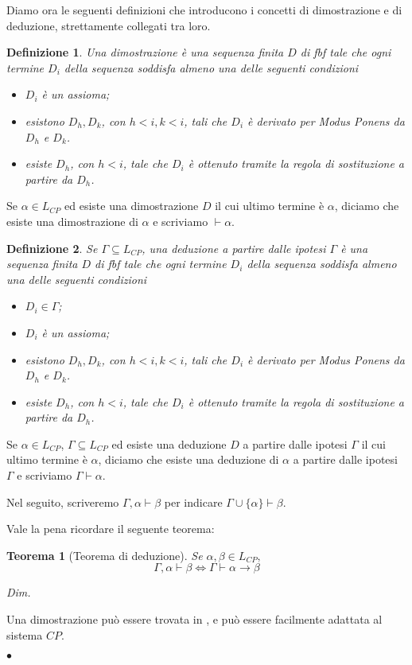 \documentclass[a4paper, titlepage, 12pt]{report}
\newtheorem{theorem}{Teorema}[chapter]
\newtheorem{definition}{Definizione}[chapter]
\newenvironment{proof}
    {\textit{Dim.}
    }
    {\begin{flushright}$\bullet$\end{flushright}
    }
\begin{document}
Diamo ora le seguenti definizioni che introducono i concetti di dimostrazione e di
deduzione, strettamente collegati tra loro.

\begin{definition}
Una dimostrazione è una sequenza finita $D$ di fbf tale che
ogni termine $D_i$ della sequenza soddisfa almeno una delle seguenti condizioni
\begin{itemize}
\item $D_i$ è un assioma;
\item esistono $D_h, D_k$, con $h < i, k < i$, tali che $D_i$ è derivato per \emph{Modus Ponens}
da $D_h$ e $D_k$.
\item esiste $D_h$, con $h < i$, tale che $D_i$ è ottenuto tramite
la regola di \emph{sostituzione} a partire da $D_h$.
\end{itemize}
\end{definition}

Se $\alpha \in L_{CP}$ ed esiste una dimostrazione $D$ il cui ultimo termine è $\alpha$,
diciamo che esiste una dimostrazione di $\alpha$ e scriviamo $\vdash \alpha$.


\begin{definition}
Se $\Gamma \subseteq L_{CP}$, una deduzione a partire dalle ipotesi $\Gamma$ è una sequenza finita $D$
di fbf tale che ogni termine $D_i$ della sequenza soddisfa almeno una delle seguenti condizioni
\begin{itemize}
\item $D_i \in \Gamma$;
\item $D_i$ è un assioma;
\item esistono $D_h, D_k$, con $h < i, k < i$, tali che $D_i$ è derivato per \emph{Modus Ponens}
da $D_h$ e $D_k$.
\item esiste $D_h$, con $h < i$, tale che $D_i$ è ottenuto tramite
la regola di \emph{sostituzione} a partire da $D_h$.
\end{itemize}
\end{definition}

Se $\alpha \in L_{CP}$, $\Gamma \subseteq L_{CP}$ ed esiste una deduzione $D$ a partire dalle ipotesi $\Gamma$
il cui ultimo termine è $\alpha$, diciamo che esiste una deduzione di $\alpha$
a partire dalle ipotesi $\Gamma$ e scriviamo $\Gamma \vdash \alpha$.

Nel seguito, scriveremo $\Gamma, \alpha \vdash \beta$
per indicare $\Gamma \cup \{\alpha\} \vdash \beta$.

Vale la pena ricordare il seguente teorema:
\begin{theorem}[Teorema di deduzione]
Se $\alpha, \beta \in L_{CP},$
$$\Gamma, \alpha \vdash \beta \Leftrightarrow \Gamma \vdash \alpha \rightarrow \beta$$
\end{theorem}
\begin{proof}
Una dimostrazione può essere trovata in \cite{Mendelson}, e può essere facilmente
adattata al sistema $CP$.
\end{proof}
\end{document}
